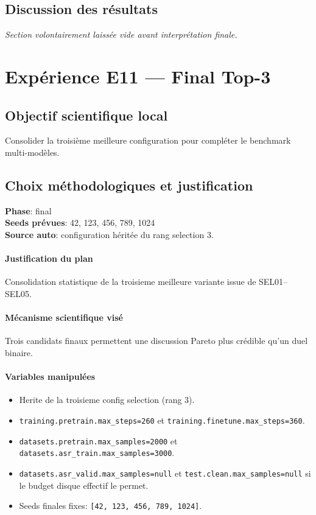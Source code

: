 \documentclass[11pt,a4paper]{article}
\begin{document}
\subsection{Discussion des résultats}
\textit{Section volontairement laissée vide avant interprétation finale.}


\section{Expérience E11 --- Final Top-3}
\subsection{Objectif scientifique local}
Consolider la troisième meilleure configuration pour compléter le benchmark multi-modèles.

\subsection{Choix méthodologiques et justification}
\textbf{Phase}: final\\
\textbf{Seeds prévues}: 42, 123, 456, 789, 1024\\
\textbf{Source auto}: configuration héritée du rang selection 3.

\paragraph{Justification du plan}
Consolidation statistique de la troisieme meilleure variante issue de SEL01--SEL05.

\paragraph{Mécanisme scientifique visé}
Trois candidats finaux permettent une discussion Pareto plus crédible qu'un duel binaire.

\paragraph{Variables manipulées}
\begin{itemize}
\item Herite de la troisieme config selection (rang 3).
\item \texttt{training.pretrain.max\_steps=260} et \texttt{training.finetune.max\_steps=360}.
\item \texttt{datasets.pretrain.max\_samples=2000} et \texttt{datasets.asr\_train.max\_samples=3000}.
\item \texttt{datasets.asr\_valid.max\_samples=null} et \texttt{test.clean.max\_samples=null} si le budget disque effectif le permet.
\item Seeds finales fixes: \texttt{[42, 123, 456, 789, 1024]}.
\end{itemize}
\end{document}
